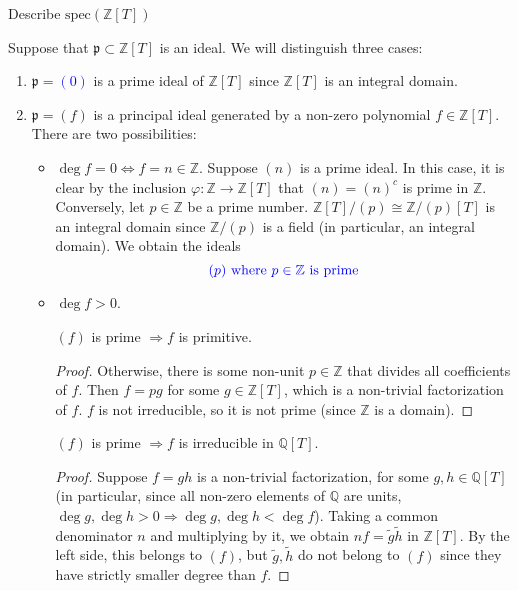 \begin{problem}\label{itm:integers_polynomial_ring_spectrum}
Describe $\text{spec}(\mathbb{Z}[T])$
\begin{sol}
    Suppose that $\mathfrak{p} \subset \mathbb{Z}[T]$ is an ideal.
    We will distinguish three cases:
    \begin{enumerate}
        \item $\mathfrak{p} = $\textcolor{blue}{$(0)$}
        is a prime ideal of $\mathbb{Z}[T]$ since $\mathbb{Z}[T]$ is an integral domain.
        \item $\mathfrak{p} = (f)$ is a principal ideal generated by a non-zero polynomial $f \in \mathbb{Z}[T]$.
        There are two possibilities:
        \begin{itemize}

            \item $\deg f = 0 \Leftrightarrow f = n \in \mathbb{Z}$.
            Suppose $(n)$ is a prime ideal.
            In this case, it is clear by the inclusion $\varphi:\mathbb{Z} \to \mathbb{Z}[T]$ that $(n) = (n)^c$ is prime in $\mathbb{Z}$.
            Conversely, let $p \in \mathbb{Z}$ be a prime number. $\mathbb{Z}[T]/(p) \cong \mathbb{Z}/(p)[T]$
            is an integral domain since $\mathbb{Z}/(p)$ is a field (in particular, an integral domain).
            We obtain the ideals
            \[
                 \textcolor{blue}{(p) \text{ where } p \in \mathbb{Z} \text{ is prime}}
            \]
            \item $\deg f > 0$.
            \begin{claim}
                $(f)$ is prime $\Rightarrow f$ is primitive.
                \begin{proof}
                    Otherwise, there is some non-unit $p \in \mathbb{Z}$ that divides all coefficients of $f$.
                    Then $f = pg$ for some $g \in \mathbb{Z}[T]$, which is a non-trivial factorization of $f$.
                    $f$ is not irreducible, so it is not prime (since $\mathbb{Z}$ is a domain).
                \end{proof}
            \end{claim}
            \begin{claim}
                $(f)$ is prime $\Rightarrow f$ is irreducible in $\mathbb{Q}[T]$.
                \begin{proof}
                    Suppose $f = gh$ is a non-trivial factorization, for some $g,h \in \mathbb{Q}[T]$ (in particular, since all non-zero elements of $\mathbb{Q}$ are units, $\deg g, \deg h > 0 \Rightarrow \deg g, \deg h < \deg f$).
                    Taking a common denominator $n$ and multiplying by it, we obtain $nf = \tilde{g}\tilde{h}$ in $\mathbb{Z}[T]$.
                    By the left side, this belongs to $(f)$, but $\tilde{g}, \tilde{h}$ do not belong to $(f)$ since they have strictly smaller degree than $f$.
                \end{proof}
            \end{claim}


\end{itemize}
\end{enumerate}
\end{sol}
\end{problem}
